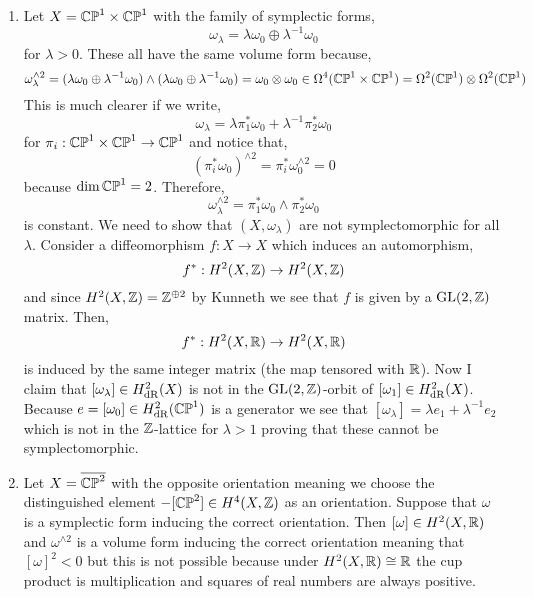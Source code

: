 \documentclass[12pt]{article}
\begin{document}
\begin{enumerate}
\item Let $X = \mathbb{CP}^1 \times \mathbb{CP}^1$ with the family of symplectic forms,
\[ \omega_\lambda = \lambda \omega_0 \oplus \lambda^{-1} \omega_0 \]
for $\lambda > 0$. These all have the same volume form because,
\[ \omega_{\lambda}^{\wedge 2} = (\lambda \omega_0 \oplus \lambda^{-1} \omega_0) \wedge (\lambda \omega_0 \oplus \lambda^{-1} \omega_0) = \omega_0 \otimes \omega_0 \in \Omega^4(\mathbb{CP}^1 \times \mathbb{CP}^1) = \Omega^2(\mathbb{CP}^1) \otimes \Omega^2(\mathbb{CP}^1) \]
This is much clearer if we write,
\[ \omega_{\lambda} = \lambda  \pi_1^* \omega_0 + \lambda^{-1} \pi_2^* \omega_0 \]
for $\pi_i : \mathbb{CP}^1 \times \mathbb{CP}^1 \to \mathbb{CP}^1$
and notice that,
\[ (\pi_i^* \omega_0) ^{\wedge 2} = \pi_i^* \omega_0^{\wedge 2} = 0 \]
because $\dim{\mathbb{CP}^1} = 2$. Therefore, 
\[ \omega_{\lambda}^{\wedge 2} = \pi_1^* \omega_0 \wedge \pi_2^* \omega_0 \]
is constant. We need to show that $(X, \omega_\lambda)$ are not symplectomorphic for all $\lambda$. Consider a diffeomorphism $f : X \to X$ which induces an automorphism,
\[ f^* : H^2(X, \mathbb{Z}) \to H^2(X, \mathbb{Z}) \]
and since $H^2(X, \mathbb{Z}) = \mathbb{Z}^{\oplus 2}$ by Kunneth we see that $f$ is given by a $\mathrm{GL}(2,\mathbb{Z})$ matrix. Then,
\[ f^* : H^2(X, \mathbb{R}) \to H^2(X, \mathbb{R}) \]
is induced by the same integer matrix (the map tensored with $\mathbb{R}$). Now I claim that $[\omega_\lambda] \in H^2_{\mathrm{dR}}(X)$ is not in the $\mathrm{GL}(2,\mathbb{Z})$-orbit of $[\omega_1] \in H^2_{\mathrm{dR}}(X)$. Because $e = [\omega_0] \in H^2_{\mathrm{dR}}(\mathbb{CP}^1)$ is a generator we see that $[\omega_\lambda ] = \lambda e_1 + \lambda^{-1} e_2$ which is not in the $\mathbb{Z}$-lattice for $\lambda > 1$ proving that these cannot be symplectomorphic.

\item Let $X = \overline{\mathbb{CP}^2}$ with the opposite orientation meaning we choose the distinguished element $-[\mathbb{CP}^2] \in H^4(X, \mathbb{Z})$ as an orientation. Suppose that $\omega$ is a symplectic form inducing the correct orientation. Then $[\omega] \in H^2(X, \mathbb{R})$ and $\omega^{\wedge 2}$ is a volume form inducing the correct orientation meaning that $[\omega]^2 < 0$ but this is not possible because under $H^2(X, \mathbb{R}) \cong \mathbb{R}$ the cup product is multiplication and squares of real numbers are always positive.
\end{enumerate}
\end{document}
